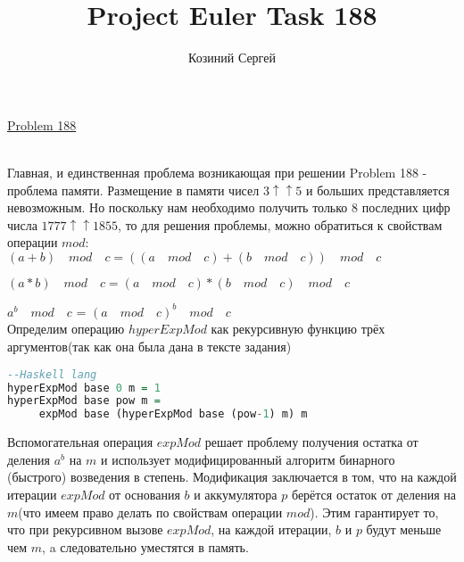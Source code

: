 \documentclass[11pt,a4paper]{article}
\title{Project Euler Task 188}
\author{Козиний Сергей}
\begin{document}
    
\maketitle
\href{''https://projecteuler.net/problem=188''}{Problem 188}

\\



Главная, и единственная проблема возникающая при решении Problem 188 - проблема памяти. Размещение в памяти чисел  ${3 ↑↑ 5}$ и больших представляется невозможным. Но поскольку нам необходимо получить только 8 последних цифр числа $1777 ↑↑ 1855$, то для решения проблемы, можно обратиться к свойствам операции $mod$:\\

$ (a+b) \quad mod \quad c = ( (a \quad mod \quad c) + (b \quad mod \quad c) )\quad mod \quad c $

$ (a*b) \quad  mod \quad c =  (a \quad mod \quad c) * (b \quad mod \quad c) \quad mod \quad c $

$ a^b \quad mod \quad c $ =  $ (a \quad mod \quad  c)^b  \quad mod \quad c $ \\

Определим операцию $hyperExpMod$ как рекурсивную функцию трёх аргументов(так как она была дана в тексте задания)

\begin{lstlisting}[language=Haskell]
--Haskell lang
hyperExpMod base 0 m = 1
hyperExpMod base pow m =
     expMod base (hyperExpMod base (pow-1) m) m
\end{lstlisting}

Вспомогательная операция ${expMod}$ решает проблему получения остатка от деления $a^b$ на $m$ и использует модифицированный алгоритм бинарного (быстрого) возведения в степень.
Модификация заключается в том, что на каждой итерации $expMod$ от основания $b$ и аккумулятора $p$ берётся остаток от деления на $m$(что имеем право делать по свойствам операции $mod$). Этим гарантирует то, что при рекурсивном вызове $expMod$, на каждой итерации, $b$ и $p$ будут меньше чем $m$, a следовательно уместятся в память.
\end{document}
